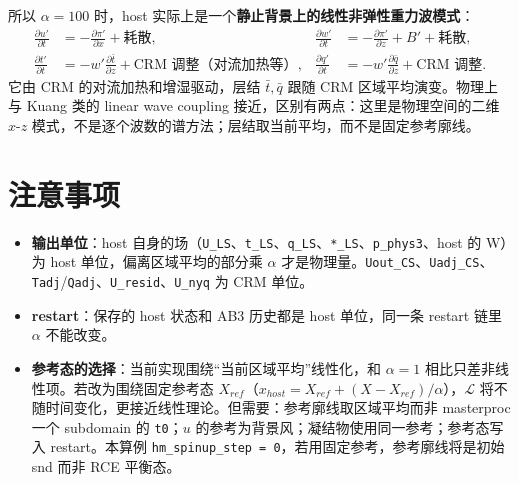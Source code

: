 \documentclass[11pt,a4paper]{article}
\newcommand{\code}[1]{\texttt{#1}}
\newcommand{\pd}[2]{\frac{\partial #1}{\partial #2}}
\begin{document}
所以 $\alpha=100$ 时，host 实际上是一个\textbf{静止背景上的线性非弹性重力波模式}：
\begin{align}
\pd{u'}{t} &= -\pd{\pi'}{x} + \text{耗散}, &
\pd{w'}{t} &= -\pd{\pi'}{z} + B' + \text{耗散},\\
\pd{t'}{t} &= -w'\pd{\bar t}{z} + \text{CRM 调整（对流加热等）}, &
\pd{q'}{t} &= -w'\pd{\bar q}{z} + \text{CRM 调整}.
\end{align}
它由 CRM 的对流加热和增湿驱动，层结 $\bar t,\bar q$ 跟随 CRM 区域平均演变。物理上与 Kuang 类的 linear wave coupling 接近，区别有两点：这里是物理空间的二维 $x$-$z$ 模式，不是逐个波数的谱方法；层结取当前平均，而不是固定参考廓线。

\section{注意事项}

\begin{itemize}[leftmargin=1.5em,itemsep=3pt]
\item \textbf{输出单位}：host 自身的场（\code{U\_LS}、\code{t\_LS}、\code{q\_LS}、\code{*\_LS}、\code{p\_phys3}、host 的 W）为 host 单位，偏离区域平均的部分乘 $\alpha$ 才是物理量。\code{Uout\_CS}、\code{Uadj\_CS}、\code{Tadj}/\code{Qadj}、\code{U\_resid}、\code{U\_nyq} 为 CRM 单位。
\item \textbf{restart}：保存的 host 状态和 AB3 历史都是 host 单位，同一条 restart 链里 $\alpha$ 不能改变。
\item \textbf{参考态的选择}：当前实现围绕“当前区域平均”线性化，和 $\alpha=1$ 相比只差非线性项。若改为围绕固定参考态 $X_{ref}$（$x_{host}=X_{ref}+(X-X_{ref})/\alpha$），$\mathcal{L}$ 将不随时间变化，更接近线性理论。但需要：参考廓线取区域平均而非 masterproc 一个 subdomain 的 \code{t0}；$u$ 的参考为背景风；凝结物使用同一参考；参考态写入 restart。本算例 \code{hm\_spinup\_step = 0}，若用固定参考，参考廓线将是初始 snd 而非 RCE 平衡态。
\end{itemize}
\end{document}
